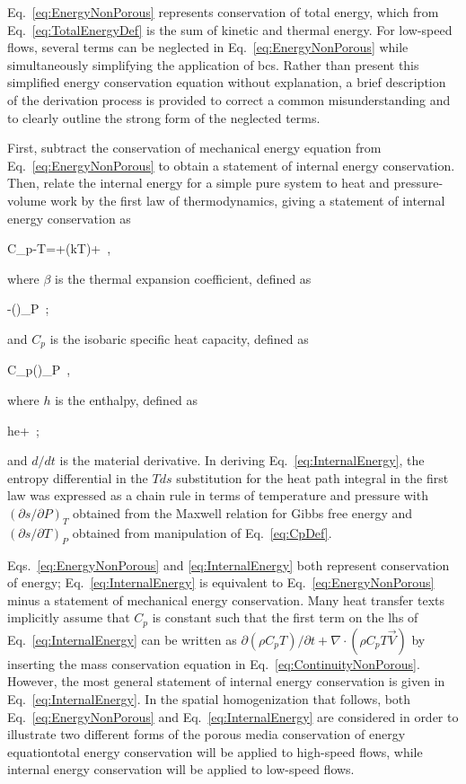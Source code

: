Eq.\ \eqref{eq:EnergyNonPorous} represents conservation of total energy, which from Eq.\ \eqref{eq:TotalEnergyDef} is the sum of kinetic and thermal energy. For low-speed flows, several terms can be neglected in Eq.\ \eqref{eq:EnergyNonPorous} while simultaneously simplifying the application of \glspl{bc}. Rather than present this simplified energy conservation equation without explanation, a brief description of the derivation process is provided to correct a common misunderstanding and to clearly outline the strong form of the neglected terms.

First, subtract the conservation of mechanical energy equation from Eq.\ \eqref{eq:EnergyNonPorous} to obtain a statement of internal energy conservation. Then, relate the internal energy for a simple pure system to heat and pressure-volume work by the first law of thermodynamics, giving a statement of internal energy conservation as

\beq
\label{eq:InternalEnergy}
\rho C_{p}-\beta T=\tau\colon\nabla{}+\nabla\cdot(k\nabla T)+\ ,
\eeq

\noindent where \(\beta\) is the thermal expansion coefficient, defined as

\beq
\label{eq:BetaDef}
\beta\equiv-\left(\right)_P\ ;
\eeq

\noindent and \(C_p\) is the isobaric specific heat capacity, defined as

\beq
\label{eq:CpDef}
C_p\equiv\left(\right)_P\ ,
\eeq

\noindent where \(h\) is the enthalpy, defined as

\beq
\label{eq:EnthalpyDef}
h\equiv e+\ ;
\eeq

\noindent and \(d/dt\) is the material derivative. In deriving Eq.\ \eqref{eq:InternalEnergy}, the entropy differential in the \(Tds\) substitution for the heat path integral in the first law was expressed as a chain rule in terms of temperature and pressure with \((\partial s/\partial P)_T\) obtained from the Maxwell relation for Gibbs free energy and \((\partial s/\partial T)_P\) obtained from manipulation of Eq.\ \eqref{eq:CpDef}. 

Eqs.\ \eqref{eq:EnergyNonPorous} and \eqref{eq:InternalEnergy} both represent conservation of energy; Eq.\ \eqref{eq:InternalEnergy} is equivalent to Eq.\ \eqref{eq:EnergyNonPorous} minus a statement of mechanical energy conservation. Many heat transfer texts implicitly assume that \(C_p\) is constant such that the first term on the \gls{lhs} of Eq.\ \eqref{eq:InternalEnergy} can be written as \(\partial(\rho C_{p}T)/\partial t+\nabla\cdot(\rho C_pT\vec{V})\) by inserting the mass conservation equation in Eq.\ \eqref{eq:ContinuityNonPorous}. However, the most general statement of internal energy conservation is given in Eq.\ \eqref{eq:InternalEnergy}. In the spatial homogenization that follows, both Eq.\ \eqref{eq:EnergyNonPorous} and Eq.\ \eqref{eq:InternalEnergy} are considered in order to illustrate two different forms of the porous media conservation of energy equation\mdash total energy conservation will be applied to high-speed flows, while internal energy conservation will be applied to low-speed flows.

